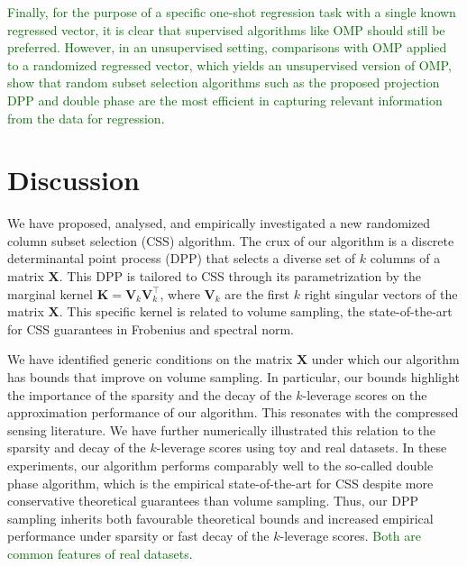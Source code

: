 \documentclass[twoside,11pt]{book}
\newcommand{\rev}[1]{\textcolor{darkgreen}{#1}}
\numberwithin{theorem}{chapter}
\numberwithin{definition}{chapter}
\numberwithin{proposition}{chapter}
\numberwithin{corollary}{chapter}
\numberwithin{example}{chapter}
\numberwithin{lemma}{chapter}
\numberwithin{assumption}{chapter}
\DeclareMathOperator{\Tran}{\intercal}
\begin{document}
\rev{Finally, for the purpose of a specific one-shot regression task with a single known regressed vector, it is clear that supervised algorithms like OMP should still be preferred. However, in an unsupervised setting, comparisons with OMP applied to a randomized regressed vector, which yields an unsupervised version of OMP, show that random subset selection algorithms such as the proposed projection DPP and double phase are the most efficient in capturing relevant information from the data for regression}.



\section{Discussion} 


We have proposed, analysed, and empirically investigated a new randomized column subset selection (CSS) algorithm. The crux of our algorithm is a discrete determinantal point process (DPP) that selects a diverse set of $k$ columns of a matrix $\bm{X}$. This DPP is tailored to CSS through its parametrization by the marginal kernel $\bm{K} = \bm{V}_{k}\bm{V}_{k}^{\Tran}$, where $\bm{V}_{k}$ are the first $k$ right singular vectors of the matrix $\bm{X}$. This specific kernel is related to volume sampling, the state-of-the-art for CSS guarantees in Frobenius and spectral norm.

We have identified generic conditions on the matrix $\bm{X}$ under which our algorithm has bounds that improve on volume sampling. In particular, our bounds highlight the importance of the sparsity and the decay of the $k$-leverage scores on the approximation performance of our algorithm. This resonates with the compressed sensing literature. We have further numerically illustrated this relation to the sparsity and decay of the $k$-leverage scores using toy and real datasets. In these experiments, our algorithm performs comparably well to the so-called double phase algorithm, which is the empirical state-of-the-art for CSS despite more conservative theoretical guarantees than volume sampling. Thus, our DPP sampling inherits both favourable theoretical bounds and increased empirical performance under sparsity or fast decay of the $k$-leverage scores. \rev{Both are common features of real datasets}.
\end{document}
